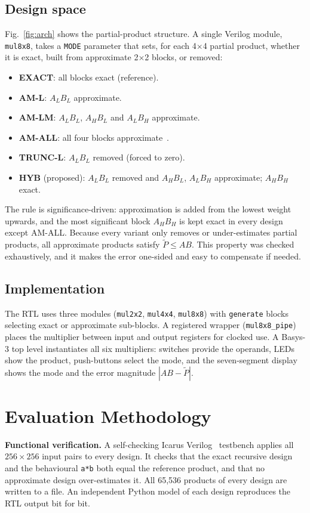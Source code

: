 \documentclass[conference]{IEEEtran}
\begin{document}
\subsection{Design space}
Fig.~\ref{fig:arch} shows the partial-product structure. A single Verilog module, \texttt{mul8x8}, takes a \texttt{MODE} parameter that sets, for each 4$\times$4 partial product, whether it is exact, built from approximate 2$\times$2 blocks, or removed:
\begin{itemize}
\item \textbf{EXACT}: all blocks exact (reference).
\item \textbf{AM-L}: $A_LB_L$ approximate.
\item \textbf{AM-LM}: $A_LB_L$, $A_HB_L$ and $A_LB_H$ approximate.
\item \textbf{AM-ALL}: all four blocks approximate~\cite{kulkarni2011udm}.
\item \textbf{TRUNC-L}: $A_LB_L$ removed (forced to zero).
\item \textbf{HYB} (proposed): $A_LB_L$ removed and $A_HB_L$, $A_LB_H$ approximate; $A_HB_H$ exact.
\end{itemize}
The rule is significance-driven: approximation is added from the lowest weight upwards, and the most significant block $A_HB_H$ is kept exact in every design except AM-ALL. Because every variant only removes or under-estimates partial products, all approximate products satisfy $\tilde{P}\le AB$. This property was checked exhaustively, and it makes the error one-sided and easy to compensate if needed.

\subsection{Implementation}
The RTL uses three modules (\texttt{mul2x2}, \texttt{mul4x4}, \texttt{mul8x8}) with \texttt{generate} blocks selecting exact or approximate sub-blocks. A registered wrapper (\texttt{mul8x8\_pipe}) places the multiplier between input and output registers for clocked use. A Basys-3 top level instantiates all six multipliers: switches provide the operands, LEDs show the product, push-buttons select the mode, and the seven-segment display shows the mode and the error magnitude $|AB-\tilde{P}|$.

\section{Evaluation Methodology}
\textbf{Functional verification.} A self-checking Icarus Verilog~\cite{iverilog} testbench applies all $256\times256$ input pairs to every design. It checks that the exact recursive design and the behavioural \texttt{a*b} both equal the reference product, and that no approximate design over-estimates it. All 65{,}536 products of every design are written to a file. An independent Python model of each design reproduces the RTL output bit for bit.
\end{document}
